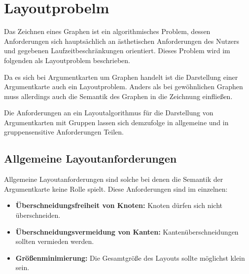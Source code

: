 
\chapter{Layoutprobelm}
\label{chapter:layoutproblem}
Das Zeichnen eines Graphen ist ein algorithmisches Problem, dessen Anforderungen sich hauptsächlich an ästhetischen Anforderungen des Nutzers und gegebenen Laufzeitbeschränkungen orientiert. Dieses Problem wird im folgenden als Layoutproblem beschrieben.

Da es sich bei Argumentkarten um Graphen handelt ist die Darstellung einer Argumentkarte auch ein Layoutproblem.
Anders als bei gewöhnlichen Graphen muss allerdings auch die Semantik des Graphen in die Zeichnung einfließen.

Die Anforderungen an ein Layoutalgorithmus für die Darstellung von Argumentkarten mit Gruppen lassen sich demzufolge in allgemeine und in gruppensensitive Anforderungen Teilen.

\section{Allgemeine Layoutanforderungen}
Allgemeine Layoutanforderungen sind solche bei denen die Semantik der Argumentkarte keine Rolle spielt.
Diese Anforderungen sind im einzelnen:

\begin{itemize}
\item {\normalfont \bfseries{Überschneidungsfreiheit von Knoten:}} \newline Knoten dürfen sich nicht überschneiden.
\item {\normalfont \bfseries{Überschneidungsvermeidung von Kanten:}}  \newline Kantenüberschneidungen sollten vermieden werden.
\item {\normalfont \bfseries{Größenminimierung:}} \newline Die Gesamtgröße des Layouts sollte möglichst klein sein.
\end{itemize}


